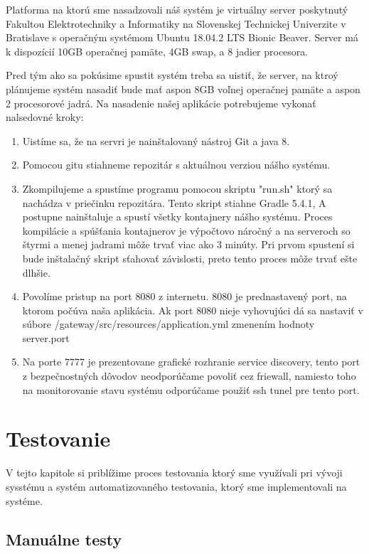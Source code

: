 Platforma na ktorú sme nasadzovali náš systém je virtuálny server poskytnutý Fakultou Elektrotechniky a Informatiky na Slovenskej Technickej Univerzite v Bratislave s operačným systémom Ubuntu 18.04.2 LTS Bionic Beaver. Server má k dispozícií 10GB operačnej pamäte, 4GB swap, a 8 jadier procesora.

Pred tým ako sa pokúsime spustit systém treba sa uistiť, že server, na ktroý plánujeme systém nasadiť bude mať aspon 8GB voľnej operačnej pamäte a aspon 2 procesorové jadrá.
Na nasadenie našej aplikácie potrebujeme vykonať nalsedovné kroky:

\begin{enumerate}
	\item Uistíme sa, že na servri je nainštalovaný nástroj Git a java 8. 
	\item Pomocou gitu stiahneme repozitár \cite{dp_repo} s aktuálnou verziou nášho systému.
	\item Zkompilujeme a spustíme programu pomocou skriptu "run.sh" ktorý sa nachádza v priečinku repozitára. Tento skript stiahne Gradle 5.4.1, A postupne nainštaluje a spustí všetky kontajnery nášho systému.
	Proces kompilácie a spúšťania kontajnerov je výpočtovo náročný a na serveroch so štyrmi a menej jadrami môže trvať viac ako 3 minúty. Pri prvom spustení si bude inštalačný skript sťahovať závislosti, preto tento proces môže trvať ešte dlhšie.  
	\item Povolíme pristup na port 8080 z internetu. 8080 je prednastavený port, na ktorom počúva naša aplikácia. Ak port 8080 nieje vyhovujúci dá sa nastaviť v súbore /gateway/src/resources/application.yml zmenením hodnoty server.port 
	\item Na porte 7777 je prezentovane grafické rozhranie service discovery, tento port z bezpečnostných dôvodov neodporúčame povoliť cez friewall, namiesto toho na monitorovanie stavu systému odporúčame použiť ssh tunel pre tento port. 
\end{enumerate}




\section{Testovanie} 
 V tejto kapitole si priblížime proces testovania ktorý sme využívali pri vývoji sysstému a systém automatizovaného testovania, ktorý sme implementovali na systéme.


\subsection{Manuálne testy}
 
